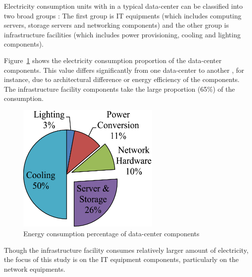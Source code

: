 Electricity consumption units with in a typical data-center can be classified into two broad groups \cite{DBLP:journals/comsur/DayarathnaWF16}: The first group is IT equipments (which includes computing servers, storage servers and networking components) and the other group is infrastructure facilities (which includes power provisioning, cooling and lighting components).

Figure~\ref{fig:datacenterenergy} \cite{DBLP:journals/comsur/DayarathnaWF16} shows the electricity consumption proportion of the data-center components. This value differs significantly from one data-center to another \cite{DBLP:series/synthesis/2013Barroso}, for instance, due to architectural difference\cite{DBLP:conf/eenergy/GyarmatiT10} or energy efficiency of the components. The infrastructure facility components take the large proportion (65\%) of the consumption. 
\begin{figure}[ht]
	\begin{center}
		\includegraphics[width=7cm]{images/datacenterenergy.pdf}
		\caption{Energy consumption percentage of data-center components \cite{DBLP:journals/comsur/DayarathnaWF16}}
		\label{fig:datacenterenergy}
	\end{center}
\end{figure}
Though the infrastructure facility consumes relatively larger amount of electricity, the focus of this study is on the IT equipment components, particularly on the network equipments. 

